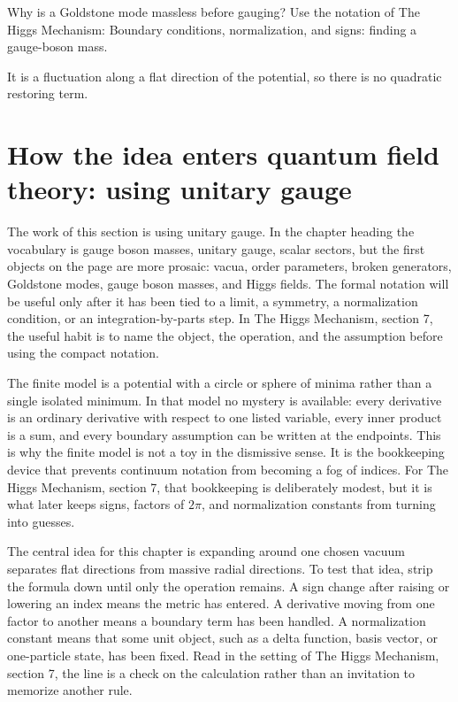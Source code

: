 \begin{exercise}
Why is a Goldstone mode massless before gauging?  Use the notation of The Higgs Mechanism: Boundary conditions, normalization, and signs: finding a gauge-boson mass.
\begin{answer}
It is a fluctuation along a flat direction of the potential, so there is no quadratic restoring term.
\end{answer}
\end{exercise}



\section{How the idea enters quantum field theory: using unitary gauge}

The work of this section is using unitary gauge.  In the chapter heading the vocabulary is gauge boson masses, unitary gauge, scalar sectors, but the first objects on the page are more prosaic: vacua, order parameters, broken generators, Goldstone modes, gauge boson masses, and Higgs fields.  The formal notation will be useful only after it has been tied to a limit, a symmetry, a normalization condition, or an integration-by-parts step.  In The Higgs Mechanism, section 7, the useful habit is to name the object, the operation, and the assumption before using the compact notation.

The finite model is a potential with a circle or sphere of minima rather than a single isolated minimum.  In that model no mystery is available: every derivative is an ordinary derivative with respect to one listed variable, every inner product is a sum, and every boundary assumption can be written at the endpoints.  This is why the finite model is not a toy in the dismissive sense.  It is the bookkeeping device that prevents continuum notation from becoming a fog of indices.  For The Higgs Mechanism, section 7, that bookkeeping is deliberately modest, but it is what later keeps signs, factors of \(2\pi\), and normalization constants from turning into guesses.

The central idea for this chapter is expanding around one chosen vacuum separates flat directions from massive radial directions.  To test that idea, strip the formula down until only the operation remains.  A sign change after raising or lowering an index means the metric has entered.  A derivative moving from one factor to another means a boundary term has been handled.  A normalization constant means that some unit object, such as a delta function, basis vector, or one-particle state, has been fixed.  Read in the setting of The Higgs Mechanism, section 7, the line is a check on the calculation rather than an invitation to memorize another rule.

